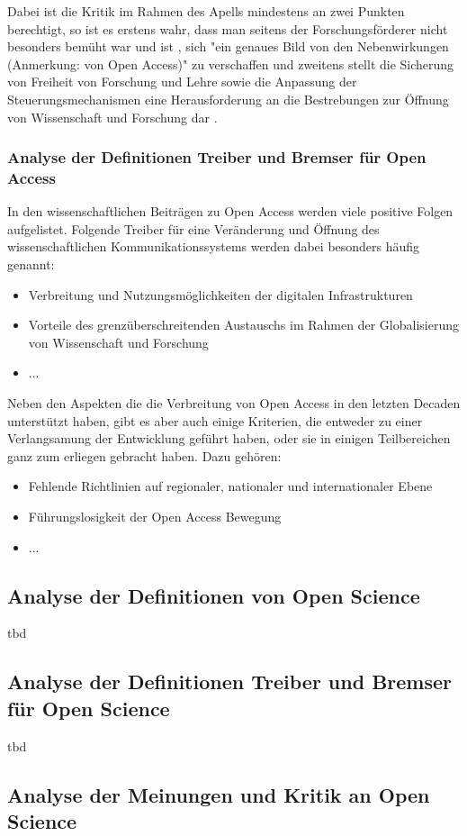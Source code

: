 Dabei ist die Kritik im Rahmen des Apells mindestens an zwei Punkten berechtigt, so ist es erstens wahr, dass man seitens der Forschungsförderer nicht besonders bemüht war und ist \cite{suchen}, sich "ein genaues Bild von den Nebenwirkungen (Anmerkung: von Open Access)" \cite{Reuss_2009} zu verschaffen und zweitens stellt die Sicherung von Freiheit von Forschung und Lehre sowie die Anpassung der Steuerungsmechanismen eine Herausforderung an die Bestrebungen zur Öffnung von Wissenschaft und Forschung dar \cite{suchen}.

\subsubsection{Analyse der Definitionen Treiber und Bremser für Open Access} 

In den wissenschaftlichen Beiträgen zu Open Access werden viele positive Folgen aufgelistet. Folgende Treiber für eine Veränderung und Öffnung des wissenschaftlichen Kommunikationssystems werden dabei besonders häufig genannt:

\begin{itemize}
\item Verbreitung und Nutzungsmöglichkeiten der digitalen Infrastrukturen
\item Vorteile des grenzüberschreitenden Austauschs im Rahmen der Globalisierung von Wissenschaft und Forschung
\item ...
\end{itemize}

Neben den Aspekten die die Verbreitung von Open Access in den letzten Decaden unterstützt haben, gibt es aber auch einige Kriterien, die entweder zu einer Verlangsamung der Entwicklung geführt haben, oder sie in einigen Teilbereichen ganz zum erliegen gebracht haben. Dazu gehören:

\begin{itemize}
\item Fehlende Richtlinien auf regionaler, nationaler und internationaler Ebene
\item Führungslosigkeit der Open Access Bewegung
\item ...
\end{itemize}

\subsection{Analyse der Definitionen von Open Science} 
tbd

\subsection{Analyse der Definitionen Treiber und Bremser für Open Science} 
tbd

\subsection{Analyse der Meinungen und Kritik an Open Science}

